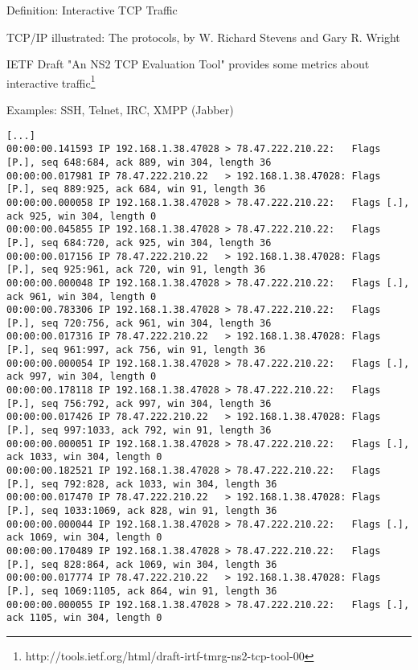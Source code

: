 \documentclass[9pt]{article}
\begin{document}
\begin{slide}
\bi
	\item Definition: Interactive TCP Traffic
	\bi
		\item TCP/IP illustrated: The protocols, by W. Richard Stevens and Gary R. Wright
		\item IETF Draft "An NS2 TCP Evaluation Tool" provides some metrics about interactive
		traffic\footnote{http://tools.ietf.org/html/draft-irtf-tmrg-ns2-tcp-tool-00}
		\item Examples: SSH, Telnet, IRC, XMPP (Jabber)
	\ei
	\bi
\begin{verbatim}
[...]
00:00:00.141593 IP 192.168.1.38.47028 > 78.47.222.210.22:   Flags [P.], seq 648:684, ack 889, win 304, length 36
00:00:00.017981 IP 78.47.222.210.22   > 192.168.1.38.47028: Flags [P.], seq 889:925, ack 684, win 91, length 36
00:00:00.000058 IP 192.168.1.38.47028 > 78.47.222.210.22:   Flags [.],  ack 925, win 304, length 0
00:00:00.045855 IP 192.168.1.38.47028 > 78.47.222.210.22:   Flags [P.], seq 684:720, ack 925, win 304, length 36
00:00:00.017156 IP 78.47.222.210.22   > 192.168.1.38.47028: Flags [P.], seq 925:961, ack 720, win 91, length 36
00:00:00.000048 IP 192.168.1.38.47028 > 78.47.222.210.22:   Flags [.],  ack 961, win 304, length 0
00:00:00.783306 IP 192.168.1.38.47028 > 78.47.222.210.22:   Flags [P.], seq 720:756, ack 961, win 304, length 36
00:00:00.017316 IP 78.47.222.210.22   > 192.168.1.38.47028: Flags [P.], seq 961:997, ack 756, win 91, length 36
00:00:00.000054 IP 192.168.1.38.47028 > 78.47.222.210.22:   Flags [.],  ack 997, win 304, length 0
00:00:00.178118 IP 192.168.1.38.47028 > 78.47.222.210.22:   Flags [P.], seq 756:792, ack 997, win 304, length 36
00:00:00.017426 IP 78.47.222.210.22   > 192.168.1.38.47028: Flags [P.], seq 997:1033, ack 792, win 91, length 36
00:00:00.000051 IP 192.168.1.38.47028 > 78.47.222.210.22:   Flags [.],  ack 1033, win 304, length 0
00:00:00.182521 IP 192.168.1.38.47028 > 78.47.222.210.22:   Flags [P.], seq 792:828, ack 1033, win 304, length 36
00:00:00.017470 IP 78.47.222.210.22   > 192.168.1.38.47028: Flags [P.], seq 1033:1069, ack 828, win 91, length 36
00:00:00.000044 IP 192.168.1.38.47028 > 78.47.222.210.22:   Flags [.],  ack 1069, win 304, length 0
00:00:00.170489 IP 192.168.1.38.47028 > 78.47.222.210.22:   Flags [P.], seq 828:864, ack 1069, win 304, length 36
00:00:00.017774 IP 78.47.222.210.22   > 192.168.1.38.47028: Flags [P.], seq 1069:1105, ack 864, win 91, length 36
00:00:00.000055 IP 192.168.1.38.47028 > 78.47.222.210.22:   Flags [.],  ack 1105, win 304, length 0

\end{verbatim}
\end{slide}
\end{document}
